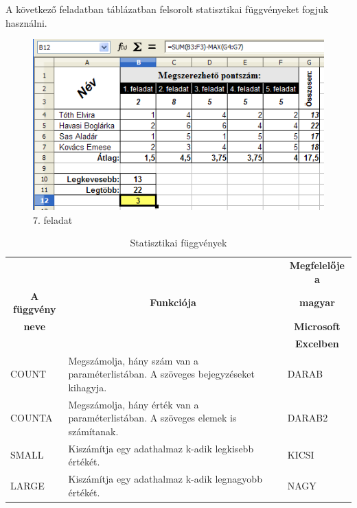 A következő feladatban  táblázatban
felsorolt statisztikai függvényeket fogjuk használni.

\begin{figure}[!h]
\begin{center}
\includegraphics[width=14.936cm]{oocalcv1-img40.png}
\caption{7. feladat}\label{7-feladatMegoldás}
\end{center}
\end{figure}

\begin{table}[!h]
\begin{center}
\caption{Statisztikai függvények}\label{StatisztikaiFüggvények}
\begin{tabular}{|m{2.5cm}|m{8cm}|m{3cm}|}
\hline
 & & \multicolumn{1}{c|}{\textbf{Megfelelője a}} \\
\multicolumn{1}{|c|}{\textbf{A függvény}}&
\multicolumn{1}{c|}{\textbf{Funkciója}}&
\multicolumn{1}{c|}{\textbf{magyar}} \\
\multicolumn{1}{|c|}{\textbf{neve}} & &
\multicolumn{1}{c|}{\textbf{Microsoft}} \\
 & & \multicolumn{1}{c|}{\textbf{Excelben}} \\
\hline
COUNT &
Megszámolja, hány szám van a paraméterlistában. A szöveges
bejegyzéseket kihagyja. &
DARAB\\ \hline
COUNTA &
Megszámolja, hány érték van a paraméterlistában. A
szöveges elemek is számítanak. &
DARAB2\\ \hline
SMALL &
Kiszámítja egy adathalmaz k-adik legkisebb értékét. &
KICSI\\ \hline
LARGE &
Kiszámítja egy adathalmaz k-adik legnagyobb értékét. &
NAGY\\ \hline
\end{tabular}
\end{center}
\end{table}

